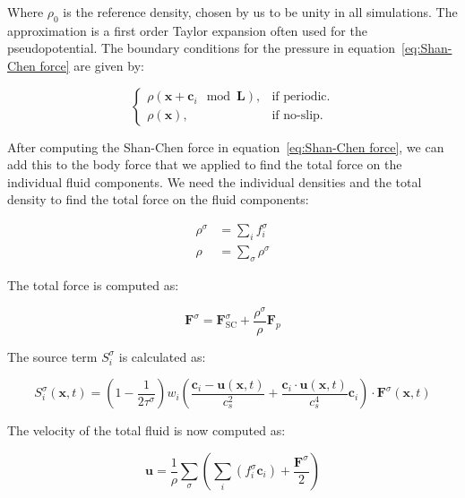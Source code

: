 Where $\rho_0$ is the reference density, chosen by us to be unity in all simulations. The approximation is a first order Taylor expansion often used for the pseudopotential. The boundary conditions for the pressure in equation~\ref{eq:Shan-Chen force} are given by:

\begin{equation}
\begin{cases}
    \rho(\bm{x} + \bm{c}_i \mod\bm{L}), & \text{if periodic.}\\
    \rho(\bm{x}), & \text{if no-slip.}
\end{cases}
\end{equation}

After computing the Shan-Chen force in equation~\ref{eq:Shan-Chen force}, we can add this to the body force that we applied to find the total force on the individual fluid components. We need the individual densities and the total density to find the total force on the fluid components:

\begin{equation}\label{eq:Multicomponent densities}
\begin{split}
    \rho^\sigma &= \sum_i f_i^\sigma\\
    \rho &= \sum_\sigma \rho^\sigma
\end{split}
\end{equation}

The total force is computed as:

\begin{equation}\label{eq:Total force Shan-Chen}
    \bm{F}^\sigma = \bm{F}^\sigma_{\text{SC}} + \frac{\rho^\sigma}{\rho}\bm{F}_p
\end{equation}

The source term $S_i^\sigma$ is calculated as:

\begin{equation}\label{eq:Source term multicomponent}
    S_i^\sigma(\bm{x}, t) = \left(1 - \frac{1}{2\tau^\sigma}\right) w_i \left(\frac{\bm{c}_i - \bm{u}(\bm{x}, t)}{c_s^2} + \frac{\bm{c}_i \cdot \bm{u}(\bm{x}, t)}{c_s^4}\bm{c}_i\right) \cdot \bm{F}^\sigma(\bm{x}, t)
\end{equation}

The velocity of the total fluid is now computed as:

\begin{equation}\label{eq:Shan-Chen velocity}
    \bm{u} = \frac{1}{\rho} \sum_\sigma \left(\sum_i \left(f_i^\sigma \bm{c}_i\right) + \frac{\bm{F}^\sigma}{2}\right)
\end{equation}

